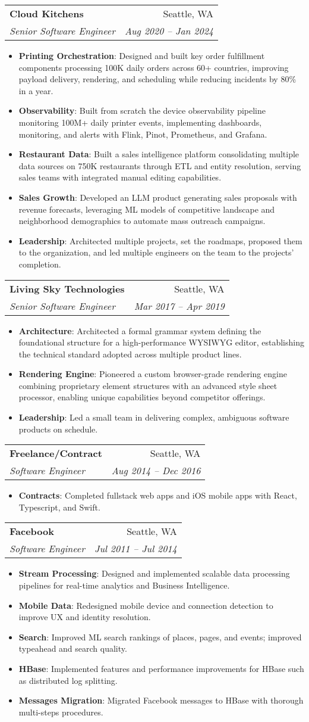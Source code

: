 \documentclass[letterpaper,11pt]{article}
\makeatletter
\newcommand{\resumeItem}[2]{
  \item\small{
    \textbf{#1}{: #2 \vspace{-2pt}}
  }
}
\newcommand{\resumeSubheading}[4]{
  \vspace{-1pt}\item
    \begin{tabular*}{0.97\textwidth}[t]{l@{\extracolsep{\fill}}r}
      \textbf{#1} & #2 \\
      \textit{\small#3} & \textit{\small #4} \\
    \end{tabular*}\vspace{-5pt}
}
\newcommand{\resumeItemListStart}{\begin{itemize}}
\newcommand{\resumeItemListEnd}{\end{itemize}\vspace{-5pt}}
\makeatother
\begin{document}
    \resumeSubheading
      {Cloud Kitchens}{Seattle, WA}
      {Senior Software Engineer}{Aug 2020 -- Jan 2024}
      \resumeItemListStart
        \resumeItem{Printing Orchestration}
          {Designed and built key order fulfillment components processing 100K daily orders across 60+ countries, improving payload delivery, rendering, and scheduling while reducing incidents by 80\% in a year.}
        \resumeItem{Observability}
          {Built from scratch the device observability pipeline monitoring 100M+ daily printer events, implementing dashboards, monitoring, and alerts with Flink, Pinot, Prometheus, and Grafana.}
        \resumeItem{Restaurant Data}
          {Built a sales intelligence platform consolidating multiple data sources on 750K restaurants through ETL and entity resolution, serving sales teams with integrated manual editing capabilities.}
        \resumeItem{Sales Growth}
          {Developed an LLM product generating sales proposals with revenue forecasts, leveraging ML models of competitive landscape and neighborhood demographics to automate mass outreach campaigns.}
        \resumeItem{Leadership}
          {Architected multiple projects, set the roadmaps, proposed them to the organization, and led multiple engineers on the team to the projects' completion.}
      \resumeItemListEnd

    \resumeSubheading
      {Living Sky Technologies}{Seattle, WA}
      {Senior Software Engineer}{Mar 2017 -- Apr 2019}
      \resumeItemListStart
        \resumeItem{Architecture}
          {Architected a formal grammar system defining the foundational structure for a high-performance WYSIWYG editor, establishing the technical standard adopted across multiple product lines.}
        \resumeItem{Rendering Engine}
          {Pioneered a custom browser-grade rendering engine combining proprietary element structures with an advanced style sheet processor, enabling unique capabilities beyond competitor offerings.}
        \resumeItem{Leadership}
          {Led a small team in delivering complex, ambiguous software products on schedule.}
      \resumeItemListEnd

    \resumeSubheading
      {Freelance/Contract}{Seattle, WA}
      {Software Engineer}{Aug 2014 -- Dec 2016}
      \resumeItemListStart
        \resumeItem{Contracts}
          {Completed fullstack web apps and iOS mobile apps with React, Typescript, and Swift.}
      \resumeItemListEnd

    \resumeSubheading
      {Facebook}{Seattle, WA}
      {Software Engineer}{Jul 2011 -- Jul 2014}
      \resumeItemListStart
        \resumeItem{Stream Processing}
          {Designed and implemented scalable data processing pipelines for real-time analytics and Business Intelligence.}
        \resumeItem{Mobile Data}
          {Redesigned mobile device and connection detection to improve UX and identity resolution.}
        \resumeItem{Search}
          {Improved ML search rankings of places, pages, and events; improved typeahead and search quality.}
        \resumeItem{HBase}
          {Implemented features and performance improvements for HBase such as distributed log splitting.}
        \resumeItem{Messages Migration}
          {Migrated Facebook messages to HBase with thorough multi-steps procedures.}
      \resumeItemListEnd
\end{document}
